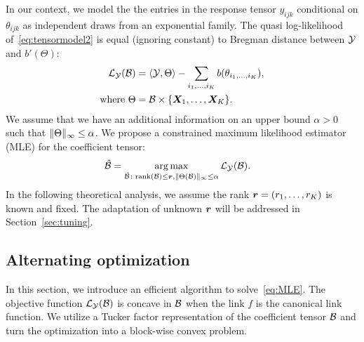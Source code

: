 \documentclass[12pt]{article}
\theoremstyle{plain}
\theoremstyle{definition}
\begin{document}
In our context, we model the the entries in the response tensor $y_{ijk}$ conditional on $\theta_{ijk}$ as independent draws from an exponential family. The quasi log-likelihood of~\eqref{eq:tensormodel2} is equal (ignoring constant) to Bregman distance between $\mathcal{Y}$ and $b'(\Theta)$:
\begin{align}
\mathcal{L}_{\mathcal{Y}}(\mathcal{B})&=\langle \mathcal{Y}, \Theta \rangle - \sum_{i_1,\ldots,i_K} b(\theta_{i_1,\ldots,i_K}),\\
\text{where}\ \Theta&=\mathcal{B}\times\{\bm X_1,\ldots,\bm X_K\}.
\end{align}
We assume that we have an additional information on an upper bound $\alpha>0$ such that $\lVert\Theta\rVert_\infty\leq \alpha$. We propose a constrained maximum likelihood estimator (MLE) for the coefficient tensor:
\begin{align} \label{eq:MLE} 
	\hat {\mathcal{B}} &=\operatorname*{arg\,max}_{\hat {\mathcal{B}} \colon \text{rank}(\mathcal{B})\leq \bm{r}, \lVert\Theta(\mathcal{B})\rVert_\infty\leq \alpha  } \mathcal{L}_{\mathcal{Y}}(\mathcal{B}).
\end{align}
In the following theoretical analysis, we assume the rank $\bm{r}=(r_1,\ldots,r_K)$ is known and fixed. The adaptation of unknown $\bm{r}$ will be addressed in Section~\ref{sec:tuning}. 

\subsection{Alternating optimization} \label{subsec:alg}
In this section, we introduce an efficient algorithm to solve~\eqref{eq:MLE}. The objective function $\mathcal{L}_{\mathcal{Y}}(\mathcal{B})$ is concave in $\mathcal{B}$ when the link $f$ is the canonical link function. We utilize a Tucker factor representation of the coefficient tensor $\mathcal{B}$ and turn the optimization into a block-wise convex problem. 
\end{document}
